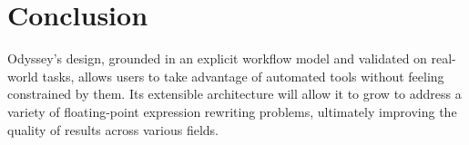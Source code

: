 \section{Conclusion}

Odyssey's design,
  grounded in an explicit workflow model
  and validated on real-world tasks,
  allows users to take advantage of automated tools
  without feeling constrained by them.
Its extensible architecture will allow it to grow
  to address
  a variety of floating-point expression rewriting problems,
  ultimately improving the quality of results across various fields. 